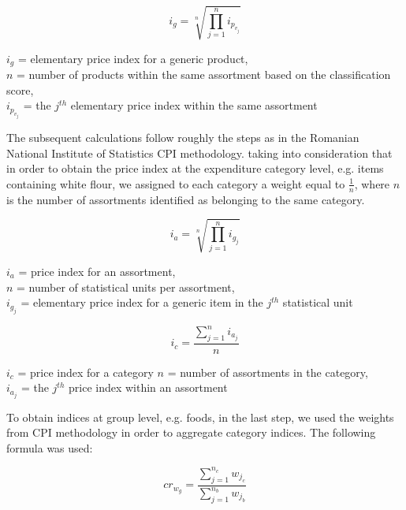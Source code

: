 \documentclass[]{article}
\begin{document}
\begin{equation}\label{eq:3}
i_{g} = \sqrt[n]{\prod_{j=1}^{n} i_{p_{v_{j}}}}
\end{equation}

\begin{center}
	$i_{g}$ = elementary price index for a generic product, \\
	$n$ = number of products within the same assortment based on the classification score, \\
	$i_{p_{v_{j}}}$ = the $j^{th}$ elementary price index within the same assortment
\end{center}

The subsequent calculations follow roughly the steps as in the Romanian National Institute of Statistics CPI methodology\cite{cpi}. taking into consideration that in order to obtain the price index at the expenditure category level, e.g. items containing white flour, we assigned to each category a weight equal to $\frac{1}{n}$,
where $n$ is the number of assortments identified as belonging to the same category. 

\begin{equation}\label{eq:4}
i_{a} = \sqrt[n]{\prod_{j=1}^n i_{g_{j}}}
\end{equation}

\begin{center}
	$i_{a}$ = price index for an assortment, \\
	$n$ = number of statistical units per assortment, \\
	$i_{g_{j}}$ = elementary price index for a generic item in the $j^{th}$ statistical unit
\end{center}


\begin{equation}\label{eq:5}
i_{c} = \frac{\sum_{j=1}^n i_{a_{j}}}{n}
\end{equation}

\begin{center}
	$i_{c}$ = price index for a category
	$n$ = number of assortments in the category, \\
	$i_{a_{j}}$ = the $j^{th}$ price index within an assortment
\end{center}

To obtain indices at group level, e.g. foods, in the last step, we used the weights from CPI methodology in order to aggregate category indices.  The following formula was used:


\begin{equation}\label{eq:6}
cr_{w_{g}} = \frac{\sum_{j=1}^{n_{c}}{w_{j_{c}}}}{\sum_{j=1}^{n_{b}}{w_{j_{b}}}}
\end{equation}
\end{document}
